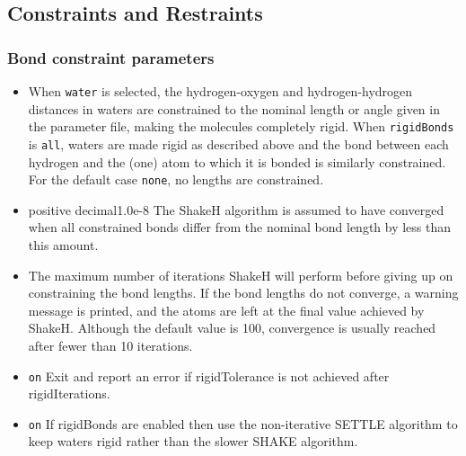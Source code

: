 \subsection{Constraints and Restraints}

\subsubsection{Bond constraint parameters}
\label{section:rigidBonds}
\begin{itemize}
\item
{} 
{When {\tt water} is selected, the hydrogen-oxygen and hydrogen-hydrogen
distances in waters are constrained to the nominal length or angle given
in the parameter file, making the molecules completely rigid.
When {\tt rigidBonds} is {\tt all}, waters are made rigid as described above
and the bond between each hydrogen and the (one) atom to which
it is bonded is similarly constrained.
For the default case {\tt none}, no lengths are constrained.
}

\item
{}
{positive decimal}{1.0e-8}
{
The ShakeH algorithm is assumed to have converged when all constrained
bonds differ from the nominal bond length by less than this amount.
}

\item
{}
{
The maximum number of iterations ShakeH will perform before giving up
on constraining the bond lengths.  If the bond lengths do not
converge, a warning message is printed, and the atoms are left at the
final value achieved by ShakeH.  
Although the default value is 100, 
convergence is usually reached after fewer than 10 iterations.
}

\item
{}
{{\tt on}}
{
Exit and report an error if rigidTolerance is not achieved after rigidIterations.
}

\item
{}
{{\tt on}}
{
If rigidBonds are enabled then use the non-iterative SETTLE algorithm to
keep waters rigid rather than the slower SHAKE algorithm.
}
\end{itemize}


